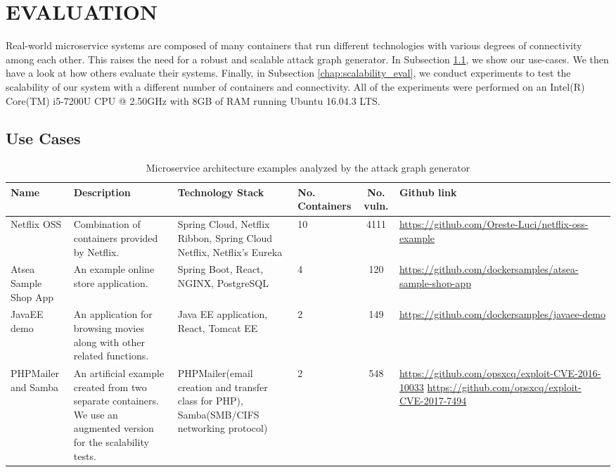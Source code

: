 
\section{EVALUATION}
\label{chap:eval}

Real-world microservice systems are composed of many containers that run different technologies with various degrees of connectivity among each other. This raises the need for a robust and scalable attack graph generator. In Subsection \ref{chap:heterogenious_systems}, we show our use-cases. We then have a look at how others evaluate their systems. Finally, in Subsection \ref{chap:scalability_eval}, we conduct experiments to test the scalability of our system with a different number of containers and connectivity. All of the experiments were performed on an Intel(R) Core(TM) i5-7200U CPU @ 2.50GHz with 8GB of RAM running Ubuntu 16.04.3 LTS.

\subsection{Use Cases}
\label{chap:heterogenious_systems}
\begin{table*}[t]
	\begin{center}
		\begin{tabular}{ p{20mm}p{35mm}p{35mm}p{10mm}cp{35mm} } 
			\hline
			Name & Description & Technology Stack & No. Containers & No. vuln. & Github link \\\hline 
			
			Netflix OSS & Combination of containers provided by Netflix. & Spring Cloud, Netflix Ribbon, Spring Cloud Netflix, Netflix's Eureka & 10 & 4111 & \url{https://github.com/Oreste-Luci/netflix-oss-example} \\
			
			Atsea Sample Shop App & An example online store application. & Spring Boot, React, NGINX, PostgreSQL & 4 & 120 & \url{https://github.com/dockersamples/atsea-sample-shop-app} \\
			
			JavaEE demo & An application for browsing movies along with other related functions. & Java EE application, React, Tomcat EE & 2 & 149 & \url{https://github.com/dockersamples/javaee-demo} \\
			
			PHPMailer and Samba & An artificial example created from two separate containers. We use an augmented version for the scalability tests. & PHPMailer(email creation and transfer class for PHP), Samba(SMB/CIFS networking protocol) & 2 & 548 &  \url{https://github.com/opsxcq/exploit-CVE-2016-10033}
			\url{https://github.com/opsxcq/exploit-CVE-2017-7494} \\
			
			
			\hline
		\end{tabular}
	\end{center}
	
	\caption{Microservice architecture examples analyzed by the attack graph generator}
	\label{table_technologies}
	
\end{table*}

